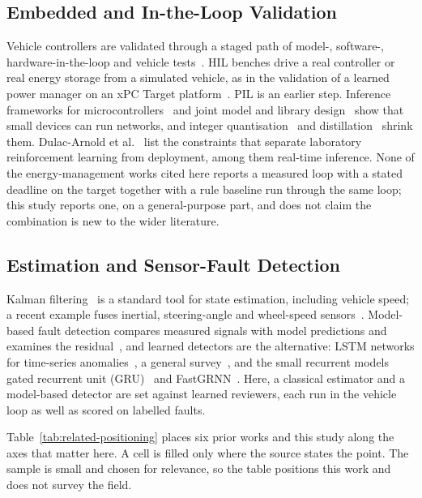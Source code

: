 \documentclass{ieeeaccess}
\begin{document}
\subsection{Embedded and In-the-Loop Validation}

Vehicle controllers are validated through a staged path of model-, software-, hardware-in-the-loop and vehicle tests~\cite{biswas2019}. HIL benches drive a real controller or real energy storage from a simulated vehicle, as in the validation of a learned power manager on an xPC Target platform~\cite{xiong2018}. PIL is an earlier step. Inference frameworks for microcontrollers~\cite{david2021} and joint model and library design~\cite{lin2020} show that small devices can run networks, and integer quantisation~\cite{jacob2018} and distillation~\cite{hinton2015} shrink them. Dulac-Arnold et al.~\cite{dulac2021} list the constraints that separate laboratory reinforcement learning from deployment, among them real-time inference. None of the energy-management works cited here reports a measured loop with a stated deadline on the target together with a rule baseline run through the same loop; this study reports one, on a general-purpose part, and does not claim the combination is new to the wider literature.

\subsection{Estimation and Sensor-Fault Detection}

Kalman filtering~\cite{kalman1960} is a standard tool for state estimation, including vehicle speed; a recent example fuses inertial, steering-angle and wheel-speed sensors~\cite{seo2025}. Model-based fault detection compares measured signals with model predictions and examines the residual~\cite{isermann2005}, and learned detectors are the alternative: LSTM networks for time-series anomalies~\cite{malhotra2015}, a general survey~\cite{chandola2009}, and the small recurrent models gated recurrent unit (GRU)~\cite{cho2014} and FastGRNN~\cite{kusupati2018}. Here, a classical estimator and a model-based detector are set against learned reviewers, each run in the vehicle loop as well as scored on labelled faults.

Table~\ref{tab:related-positioning} places six prior works and this study along the axes that matter here. A cell is filled only where the source states the point. The sample is small and chosen for relevance, so the table positions this work and does not survey the field.
\end{document}
